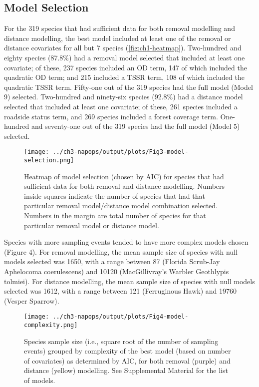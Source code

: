 \subsection{Model Selection}
\par For the 319 species that had sufficient data for both removal modelling and distance modelling, the best model included at least one of the removal or distance covariates for all but 7 species (\autoref{fig:ch1-heatmap}). Two-hundred and eighty species (87.8\%) had a removal model selected that included at least one covariate; of these, 237 species included an OD term, 147 of which included the quadratic OD term; and 215 included a TSSR term, 108 of which included the quadratic TSSR term. Fifty-one out of the 319 species had the full model (Model 9) selected. Two-hundred and ninety-six species (92.8\%) had a distance model selected that included at least one covariate; of these, 261 species included a roadside status term, and 269 species included a forest coverage term. One-hundred and seventy-one out of the 319 species had the full model (Model 5) selected.

\begin{figure}[h]
	\centering
	\texttt{[image: ../ch3-napops/output/plots/Fig3-model-selection.png]}
	\caption{\label{fig:ch1-heatmap}Heatmap of model selection (chosen by AIC) for species that had sufficient data for both removal and distance modelling. Numbers inside squares indicate the number of species that had that particular removal model/distance model combination selected. Numbers in the margin are total number of species for that particular removal model or distance model.}
\end{figure}

\par Species with more sampling events tended to have more complex models chosen (Figure 4). For removal modelling, the mean sample size of species with null models selected was 1650, with a range between 87 (Florida Scrub-Jay Aphelocoma coerulescens) and 10120 (MacGillivray’s Warbler Geothlypis tolmiei). For distance modelling, the mean sample size of species with null models selected was 1612, with a range between 121 (Ferruginous Hawk) and 19760 (Vesper Sparrow).

\begin{figure}[h]
	\centering
	\texttt{[image: ../ch3-napops/output/plots/Fig4-model-complexity.png]}
	\caption{\label{fig:ch1-complexity}Species sample size (i.e., square root of the number of sampling events) grouped by complexity of the best model (based on number of covariates) as determined by AIC, for both removal (purple) and distance (yellow) modelling. See Supplemental Material for the list of models.}
\end{figure}


